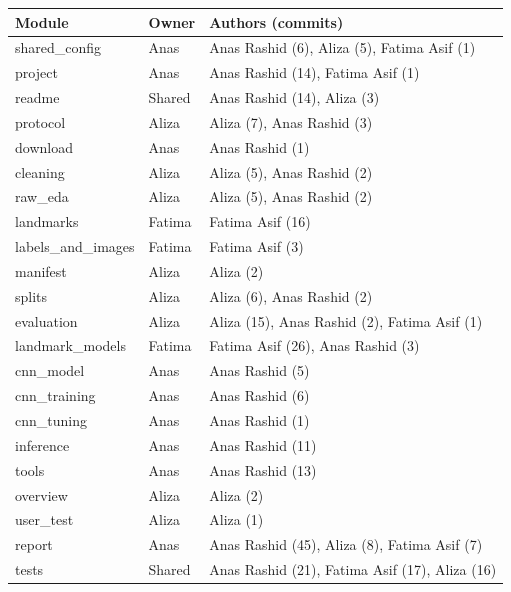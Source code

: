 \begin{tabular}{lll}
\hline
Module & Owner & Authors (commits) \\
\hline
shared\_config & Anas & Anas Rashid (6), Aliza (5), Fatima Asif (1) \\
project & Anas & Anas Rashid (14), Fatima Asif (1) \\
readme & Shared & Anas Rashid (14), Aliza (3) \\
protocol & Aliza & Aliza (7), Anas Rashid (3) \\
download & Anas & Anas Rashid (1) \\
cleaning & Aliza & Aliza (5), Anas Rashid (2) \\
raw\_eda & Aliza & Aliza (5), Anas Rashid (2) \\
landmarks & Fatima & Fatima Asif (16) \\
labels\_and\_images & Fatima & Fatima Asif (3) \\
manifest & Aliza & Aliza (2) \\
splits & Aliza & Aliza (6), Anas Rashid (2) \\
evaluation & Aliza & Aliza (15), Anas Rashid (2), Fatima Asif (1) \\
landmark\_models & Fatima & Fatima Asif (26), Anas Rashid (3) \\
cnn\_model & Anas & Anas Rashid (5) \\
cnn\_training & Anas & Anas Rashid (6) \\
cnn\_tuning & Anas & Anas Rashid (1) \\
inference & Anas & Anas Rashid (11) \\
tools & Anas & Anas Rashid (13) \\
overview & Aliza & Aliza (2) \\
user\_test & Aliza & Aliza (1) \\
report & Anas & Anas Rashid (45), Aliza (8), Fatima Asif (7) \\
tests & Shared & Anas Rashid (21), Fatima Asif (17), Aliza (16) \\
\hline
\end{tabular}
